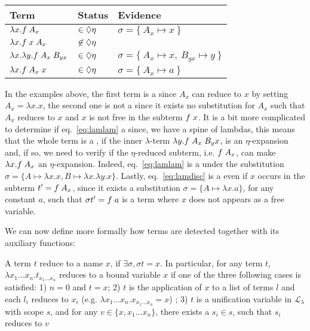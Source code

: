 \documentclass[sigconf,natbib=false,review]{acmart}
\newcommand{\appsep}{\ensuremath{\textcolor{lightgray}{\cdot}}}
\newcommand{\llambda}{\ensuremath{\mathcal{L}_\lambda}\xspace}
\begin{document}
\begin{center}
  \begin{tabular}{lll}
    Term & Status & Evidence \\\hline
    $\lambda x. f \appsep A_x$ & $\in\Diamond\eta$ & $\sigma = \{~ A_x \mapsto x ~\}$ \\
    $\lambda x. f \appsep x \appsep A_x$ & $\not\in\Diamond\eta$ &\\
    $\lambda x. \lambda y. f \appsep A_x \appsep B_{y x}$ & $\in\Diamond\eta$ & $\sigma = \{~ A_x \mapsto x,~ B_{yx} \mapsto y ~\}$\\
    $\lambda x. f \appsep A_x \appsep x$ & $\in\Diamond\eta$ & $\sigma = \{~ A_x \mapsto a ~\}$
  \end{tabular}
\end{center}


In the examples above, the first term is a \maybeeta since $A_x$ can
reduce to $x$ by setting $A_x = \lambda x.x$, 
the second one is not a \maybeeta since it exists no substitution
for $A_x$ such that $A_x$ reduces to $x$ and $x$ is not free in the subterm $f \appsep x$.
It is a bit more complicated to determine if eq.~\ref{eq:lamlam} a \maybeeta since,
we have a spine of lambdas, this means that the whole term
is a \maybeeta, if the inner $\lambda$-term $\lambda y.f\appsep A_x\appsep B_yx$,
is an $\eta$-expansion and, if so, we need to verify if the $\eta$-reduced 
subterm, i.e. $f \appsep A_x$, can make $\lambda x.f \appsep A_x$ an $\eta$-expansion.
Indeed, eq.~\ref{eq:lamlam} is a \maybeeta under the substitution 
$\sigma = \{A \mapsto \lambda x.x, B \mapsto \lambda x. \lambda y. x\}$.
Lastly, eq.~\ref{eq:lamdisc} is a \maybeeta even if $x$
occurs in the subterm $t' = f \appsep A_x$, since it exists a substitution
$\sigma = \{A \mapsto \lambda x.a\}$, for any constant $a$, such that $\sigma t'
= f \appsep a$ is a term where $x$ does not appears as a free variable. 

We can now define more formally how \maybeeta terms are detected together with
its auxiliary functions:

\begin{definition}[reduce-to]
  A term $t$ reduce to a name $x$, if $\exists \sigma, \sigma t = x$. In
  particular, for any term $t$, $\lambda x_1 \ldots x_n.t_{x_1\ldots x_n}$
  reduces to a bound variable $x$ if one of the three following cases is
  satisfied: 1) $n = 0$ and $t = x$; 2) $t$ is the application of $x$ to a list
  of terms $l$ and each $l_i$ reduces to $x_i$
  (e.g. $\lambda x_1 \ldots x_n.x_{x_1\ldots x_n} = x$) ; 3) $t$ is a unification
  variable in \llambda with scope
  $s$, and for any $v \in \{ x, x_1 \ldots x_n \}$,
  there exists a $s_i \in s$, such that $s_i$ reduces to $v$
\end{definition}
\end{document}
